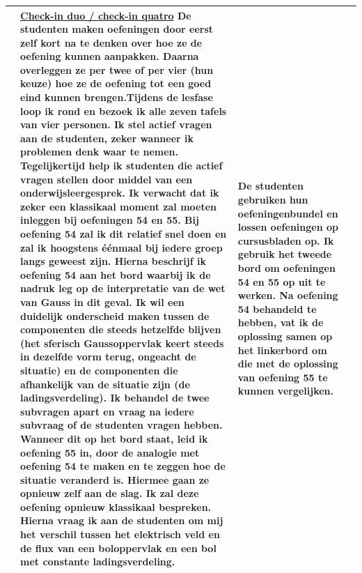 \begin{landscape}
\begin{tabularx}{1.56\textwidth}{|p{1.5cm}|p{6cm}|X|p{4cm}|}
	&  \underline{Check-in duo / check-in quatro}\newline 
	De studenten maken oefeningen door eerst zelf kort na te denken over hoe ze de oefening kunnen aanpakken. Daarna overleggen ze per twee of per vier (hun keuze) hoe ze de oefening tot een goed eind kunnen brengen.\newline	Tijdens de lesfase loop ik rond en bezoek ik alle zeven tafels van vier personen. Ik stel actief vragen aan de studenten, zeker wanneer ik problemen denk waar te nemen. Tegelijkertijd help ik studenten die actief vragen stellen door middel van een onderwijsleergesprek. \newline
	Ik verwacht dat ik zeker een klassikaal moment zal moeten inleggen bij oefeningen 54 en 55. Bij oefening 54 zal ik dit relatief snel doen en zal ik hoogstens éénmaal bij iedere groep langs geweest zijn. Hierna beschrijf ik oefening 54 aan het bord waarbij ik de nadruk leg op de interpretatie van de wet van Gauss in dit geval. Ik wil een duidelijk onderscheid maken tussen de componenten die steeds hetzelfde blijven (het sferisch Gaussoppervlak keert steeds in dezelfde vorm terug, ongeacht de situatie)  en de componenten die afhankelijk van de situatie zijn (de ladingsverdeling). Ik behandel de twee subvragen apart en vraag na iedere subvraag of de studenten vragen hebben. \newline
	Wanneer dit op het bord staat, leid ik oefening 55 in, door de analogie met oefening 54 te maken en te zeggen hoe de situatie veranderd is. Hiermee gaan ze opnieuw zelf aan de slag. Ik zal deze oefening opnieuw klassikaal bespreken. Hierna vraag ik aan de studenten om mij het verschil tussen het elektrisch veld en de flux van een boloppervlak en een bol met constante ladingsverdeling.
	& De studenten gebruiken hun oefeningenbundel en lossen oefeningen op cursusbladen op. Ik gebruik het tweede bord om oefeningen 54 en 55 op uit te werken. Na oefening 54 behandeld te hebben, vat ik de oplossing samen op het linkerbord om die met de oplossing van oefening 55 te kunnen vergelijken.
	\\ \hline
\end{tabularx}




\end{landscape}
